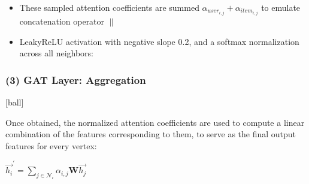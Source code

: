 \documentclass{beamer}
\begin{document}

\begin{frame}[fragile]
\begin{itemize}
\frametitle{(2) Self-Attention: Code}
[ball]

\item These sampled attention coefficients are summed $\alpha_{user_{i,j}}+\alpha_{item_{i,j}}$ to emulate concatenation operator $\|$

\vspace{0.3cm}



\vspace{0.3cm}

\item LeakyReLU activation with negative slope 0.2, and a softmax normalization across all neighbors:



\end{itemize}
\end{frame}



\begin{frame}[fragile]
\begin{itemize}
\frametitle{(3) GAT Layer: Aggregation}
[ball]

\item Once obtained, the normalized attention coefficients are used to compute a linear combination of the features corresponding to them, to serve as the final output features for every vertex:

\vspace{0.5cm}

\begin{center}
    \item[] $\overrightarrow{h_{i}}^{'} = \sum_{j \in \mathcal{N}_{i}} \alpha_{i,j} \textbf{W}\overrightarrow{h_{j}} $
\end{center}

\end{itemize}
\end{frame}
\end{document}
